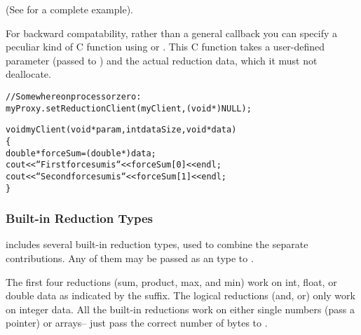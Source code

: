 (See  for a complete example).

For backward compatability, rather than a general callback you can
specify a peculiar kind of C function using 
or .  This C function takes a user-defined
parameter (passed to ) and the actual reduction data,
which it must not deallocate.

\begin{alltt}
  //Somewhere on processor zero:
  myProxy.setReductionClient(myClient,(void *)NULL);

void myClient(void *param,int dataSize,void *data)
\{
  double *forceSum=(double *)data;
  cout<<``First force sum is ``<<forceSum[0]<<endl;
  cout<<``Second force sum is ``<<forceSum[1]<<endl;
\}
\end{alltt}



\subsubsection{Built-in Reduction Types}

\label{builtin_reduction}

\charmpp{} includes several built-in reduction types, used to combine 
the separate contributions.  Any of them may be passed as an
 type to .

The first four reductions (sum, product, max, and min) work on int,
float, or double data as indicated by the suffix.  The logical
reductions (and, or) only work on integer data.  All the built-in
reductions work on either single numbers (pass a pointer) or arrays-- just
pass the correct number of bytes to .


